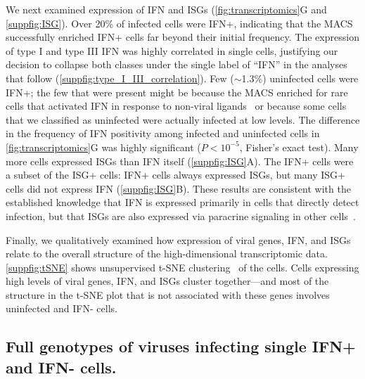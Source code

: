 \documentclass[]{asm-article}
\newcommand{\FIG}[1]{\autoref{fig:#1}}
\newcommand{\SUPPFIG}[1]{\autoref{suppfig:#1}}
\begin{document}
We next examined expression of IFN and ISGs (\FIG{transcriptomics}G and \SUPPFIG{ISG}).
Over 20\% of infected cells were IFN+, indicating that the MACS successfully enriched IFN+ cells far beyond their initial frequency.
The expression of type I and type III IFN was highly correlated in single cells, justifying our decision to collapse both classes under the single label of ``IFN'' in the analyses that follow (\SUPPFIG{type_I_III_correlation}).
Few ($\sim$1.3\%) uninfected cells were IFN+; the few that were present might be because the MACS enriched for rare cells that activated IFN in response to non-viral ligands~\cite{dhir2018mitochondrial, benitez2015vivo, chiang2018viral} or because some cells that we classified as uninfected were actually infected at low levels.
The difference in the frequency of IFN positivity among infected and uninfected cells in \FIG{transcriptomics}G was highly significant ($P < 10^{-5}$, Fisher's exact test).
Many more cells expressed ISGs than IFN itself (\SUPPFIG{ISG}A).
The IFN+ cells were a subset of the ISG+ cells: IFN+ cells always expressed ISGs, but many ISG+ cells did not express IFN (\SUPPFIG{ISG}B).
These results are consistent with the established knowledge that IFN is expressed primarily in cells that directly detect infection, but that ISGs are also expressed via paracrine signaling in other cells~\cite{stetson2006type,honda2006type}.

Finally, we qualitatively examined how expression of viral genes, IFN, and ISGs relate to the overall structure of the high-dimensional transcriptomic data.
\SUPPFIG{tSNE} shows unsupervised t-SNE clustering~\cite{maaten2008visualizing} of the cells.
Cells expressing high levels of viral genes, IFN, and ISGs cluster together---and most of the structure in the t-SNE plot that is not associated with these genes involves uninfected and IFN- cells.

\subsection{Full genotypes of viruses infecting single IFN+ and IFN- cells.}
\end{document}
